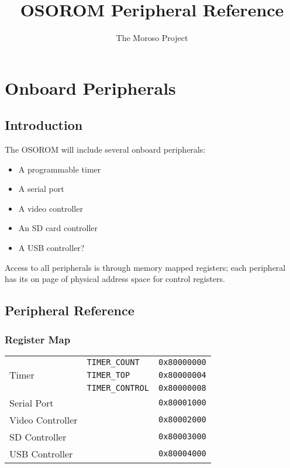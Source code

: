 \documentclass[11pt,openany]{report}
\title{OSOROM Peripheral Reference}
\author{The Moroso Project}
\begin{document}
\maketitle
\tableofcontents

\chapter{Onboard Peripherals}

\section{Introduction}
The OSOROM will include several onboard peripherals:
\begin{itemize}
\item A programmable timer
\item A serial port
\item A video controller
\item An SD card controller
\item A USB controller?
\end{itemize}

Access to all peripherals is through memory mapped registers; each
peripheral has its on page of physical address space for control
registers.

\section{Peripheral Reference}
\subsection{Register Map}
\centering
\begin{tabular}{|l|l|l|}
  \hline
  \multirow{3}{*}{Timer} & \verb|TIMER_COUNT| & \texttt{0x80000000} \\
  & \verb|TIMER_TOP| & \texttt{0x80000004} \\
  & \verb|TIMER_CONTROL| & \texttt{0x80000008} \\
  \hline
  Serial Port & & \texttt{0x80001000} \\
  \hline
  Video Controller & & \texttt{0x80002000} \\
  \hline
  SD Controller & & \texttt{0x80003000} \\
  \hline
  USB Controller & & \texttt{0x80004000} \\
  \hline
\end{tabular}
\end{document}

